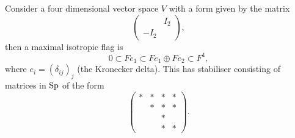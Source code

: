 \begin{example}
        Consider a four dimensional vector space \(V\) with a form given by the matrix
        \[\begin{pmatrix}
            & I_2 \\
            -I_2 & 
        \end{pmatrix},\]
        then a maximal isotropic flag is 
        \[0 \subset Fe_1 \subset Fe_1 \oplus Fe_2 \subset F^4,\]
        where \(e_i = (\delta_{ij})_j\) (the Kronecker delta). This has stabiliser consisting of matrices in \(\operatorname{Sp}\) of the form
        \[\begin{pmatrix}
            *&*&*&* \\
             &*&*&* \\
             && *& \\
             && *& *
        \end{pmatrix}.\]
    \end{example}

